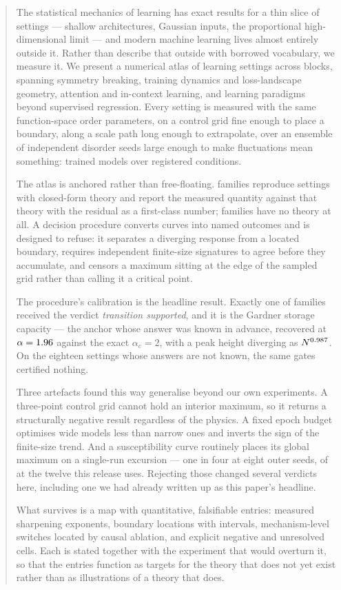 \begin{abstract}
The statistical mechanics of learning has exact results for a thin slice of
settings --- shallow architectures, Gaussian inputs, the proportional
high-dimensional limit --- and modern machine learning lives almost entirely
outside it. Rather than describe that outside with borrowed vocabulary, we
measure it. We present a numerical atlas of \AtlasTotalFamilies{} learning
settings across \AtlasTotalBlocks{} blocks, spanning symmetry breaking,
training dynamics and loss-landscape geometry, attention and in-context
learning, and learning paradigms beyond supervised regression. Every setting is
measured with the same function-space order parameters, on a control grid fine
enough to place a boundary, along a scale path long enough to extrapolate, over
an ensemble of independent disorder seeds large enough to make fluctuations
mean something: \AtlasTotalRuns{} trained models over
\AtlasTotalConditions{} registered conditions.

The atlas is anchored rather than free-floating. \AtlasAnchorFamilies{}
families reproduce settings with closed-form theory and report the measured
quantity against that theory with the residual as a first-class number;
\AtlasNoTheoryFamilies{} families have no theory at all. A decision procedure
converts curves into named outcomes and is designed to refuse: it separates a
diverging response from a located boundary, requires independent finite-size
signatures to agree before they accumulate, and censors a maximum sitting at
the edge of the sampled grid rather than calling it a critical point.

The procedure's calibration is the headline result. Exactly one of
\AtlasTotalFamilies{} families received the verdict \emph{transition
supported}, and it is the Gardner storage capacity --- the anchor whose answer
was known in advance, recovered at
$\alpha=\AtlasPerceptronCapacityPeakControl{}$ against the exact $\alpha_c=2$,
with a peak height diverging as
$N^{\AtlasPerceptronCapacitySharpening{}}$. On the eighteen settings whose
answers are not known, the same gates certified nothing.

Three artefacts found this way generalise beyond our own experiments. A
three-point control grid cannot hold an interior maximum, so it returns a
structurally negative result regardless of the physics. A fixed epoch budget
optimises wide models less than narrow ones and inverts the sign of the
finite-size trend. And a susceptibility curve
routinely places its global maximum on a single-run excursion --- one in four at
eight outer seeds, \AtlasSpikeRejected{} of \AtlasSpikeTotal{} at the twelve
this release uses. Rejecting those changed several verdicts here, including one
we had already written up as this paper's headline.

What survives is a map with quantitative, falsifiable entries: measured
sharpening exponents, boundary locations with intervals, mechanism-level
switches located by causal ablation, and explicit negative and unresolved
cells. Each is stated together with the experiment that would overturn it, so
that the entries function as targets for the theory that does not yet exist
rather than as illustrations of a theory that does.
\end{abstract}
